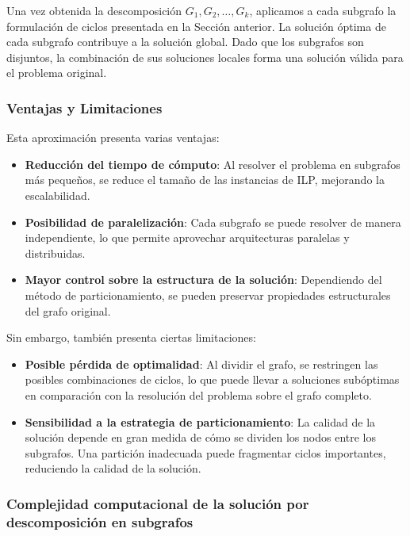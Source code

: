 \documentclass[twocolumn, fontsize=10pt]{article}
\theoremstyle{definition} %
\begin{document}
Una vez obtenida la descomposición \( G_1, G_2, \dots, G_k \), aplicamos a cada subgrafo la formulación de ciclos presentada en la Sección anterior. La solución óptima de cada subgrafo contribuye a la solución global. Dado que los subgrafos son disjuntos, la combinación de sus soluciones locales forma una solución válida para el problema original.

\subsubsection{Ventajas y Limitaciones}

Esta aproximación presenta varias ventajas:

\begin{itemize}
    \item \textbf{Reducción del tiempo de cómputo}: Al resolver el problema en subgrafos más pequeños, se reduce el tamaño de las instancias de ILP, mejorando la escalabilidad.
    \item \textbf{Posibilidad de paralelización}: Cada subgrafo se puede resolver de manera independiente, lo que permite aprovechar arquitecturas paralelas y distribuidas.
    \item \textbf{Mayor control sobre la estructura de la solución}: Dependiendo del método de particionamiento, se pueden preservar propiedades estructurales del grafo original.
\end{itemize}

Sin embargo, también presenta ciertas limitaciones:

\begin{itemize}
    \item \textbf{Posible pérdida de optimalidad}: Al dividir el grafo, se restringen las posibles combinaciones de ciclos, lo que puede llevar a soluciones subóptimas en comparación con la resolución del problema sobre el grafo completo.
    \item \textbf{Sensibilidad a la estrategia de particionamiento}: La calidad de la solución depende en gran medida de cómo se dividen los nodos entre los subgrafos. Una partición inadecuada puede fragmentar ciclos importantes, reduciendo la calidad de la solución.
\end{itemize}

\subsubsection{Complejidad computacional de la solución por descomposición en subgrafos}
\end{document}
